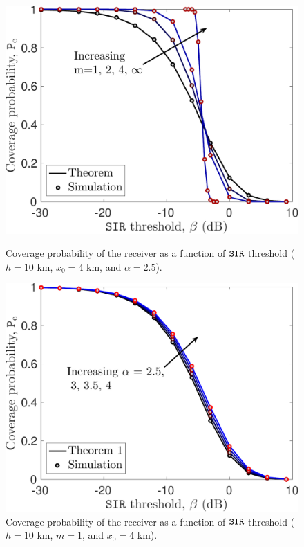 \documentclass[journal,draftclsnofoot,onecolumn,12pt]{IEEEtran}
\begin{document}
\begin{figure}
\begin{minipage}{.49\textwidth}
\includegraphics[width=1\textwidth]{./impactm}
\caption{Coverage probability of the receiver as a function of $\mathtt{SIR}$ threshold ($h=10$ km, $x_0 = 4$ km, and $\alpha = 2.5$).}
\label{fig:impactm}
\end{minipage}%
\hfill
\begin{minipage}{.49\textwidth}
\includegraphics[width=1\textwidth]{./impacta}
\caption{Coverage probability of the receiver as a function of $\mathtt{SIR}$ threshold ($h = 10$ km, $m = 1$, and $x_0 = 4$ km).}
\label{fig:impacta}
\end{minipage}
\end{figure}
\end{document}
